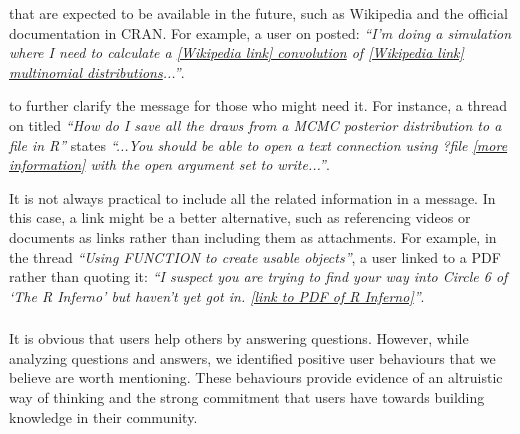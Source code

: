    \begin{description}[itemsep=3pt, topsep=2pt, leftmargin=1em, parsep=0pt]
        \item[Use well-maintained Websites] that are expected to be available in the future, such as Wikipedia and the official documentation in CRAN.
        For example, %
        a user on \SO posted: \textit{``I'm doing a simulation where I need to calculate a \href{https://en.wikipedia.org/wiki/Convolution_of_probability_distributions}{[Wikipedia link] convolution} of
          \href{https://en.wikipedia.org/wiki/Multinomial_distribution}{[Wikipedia link] multinomial distributions}...''}.

        \item[Use resources that support or expand the message] to further clarify the message for those who might need it. For instance, a thread on \SO titled \textit{``How do I save all the draws from a MCMC posterior distribution to a file in R''} states \textit{``...You should be able to open a text connection using ?file \href{http://stat.ethz.ch/R-manual/R-devel/library/base/html/connections.html}{[more information]} with the open argument set to write...''}.

        \item[What to do when material relevant to the message is too big.] It is not always practical to include all the related information in a message. In this
          case, a link might be a better alternative, such as referencing videos or documents as links rather than including them as attachments.
        For example, in the \RH thread \textit{``Using FUNCTION to create usable objects''}, a user linked to a PDF rather than quoting it: \textit{``I suspect you are trying to find your way
          into Circle 6 of `The R Inferno' but haven't yet got in. \href{http://www.burns-stat.com/pages/Tutor/R\_inferno.pdf}{[link to PDF of R Inferno]}''}.
    \end{description}

\subsubsection{\rece}
\label{sec:userbeh}

It is obvious that users help others by answering questions. However, while analyzing questions and answers, we identified positive user behaviours that
we believe are worth mentioning.  These behaviours provide evidence of an altruistic way of thinking and the strong commitment that users have towards building knowledge in their community.

